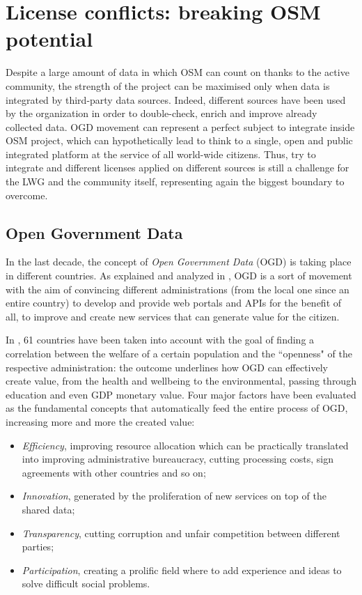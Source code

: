 \section{License conflicts: breaking OSM potential}
Despite a large amount of data in which OSM can count on thanks to the active community, the strength of the project can be maximised only when data is integrated by third-party data sources. Indeed, different sources have been used by the organization in order to double-check, enrich and improve already collected data.
OGD movement can represent a perfect subject to integrate inside OSM project, which can hypothetically lead to think to a single, open and public integrated platform at the service of all world-wide citizens.
Thus, try to integrate and different licenses applied on different sources is still a challenge for the LWG and the community itself, representing again the biggest boundary to overcome.

\subsection{Open Government Data}\label{previous}
In the last decade, the concept of \textit{Open Government Data} (OGD) is taking place in different countries. As explained and analyzed in \cite{ubaldi2013open}, OGD is a sort of movement with the aim of convincing different administrations (from the local one since an entire country) to develop and provide web portals and APIs for the benefit of all, to improve and create new services that can generate value for the citizen.

In \cite{jetzek2013generating}, 61 countries have been taken into account with the goal of finding a correlation between the welfare of a certain population and the ``openness" of the respective administration: the outcome underlines how OGD can effectively create value, from the health and wellbeing to the environmental, passing through education and even GDP monetary value.
Four major factors have been evaluated as the fundamental concepts that automatically feed the entire process of OGD, increasing more and more the created value:
\begin{itemize}
    \item \textit{Efficiency}, improving resource allocation which can be practically translated into improving administrative bureaucracy, cutting processing costs, sign agreements with other countries and so on;
    \item \textit{Innovation}, generated by the proliferation of new services on top of the shared data;
    \item \textit{Transparency}, cutting corruption and unfair competition between different parties;
    \item \textit{Participation}, creating a prolific field where to add experience and ideas to solve difficult social problems.
\end{itemize}

